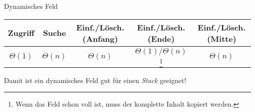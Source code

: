 \begin{defi}{Dynamisches Feld}
    \begin{center}
        \begin{tabular}{c|c|c|c|c}
            Zugriff     & Suche       & Einf./Lösch. (Anfang) & Einf./Lösch. (Ende)                                                                                     & Einf./Lösch. (Mitte) \\
            \hline
            $\Theta(1)$ & $\Theta(n)$ & $\Theta(n)$           & $\Theta(1)/\Theta(n)$\footnote{Wenn das Feld schon voll ist, muss der komplette Inhalt kopiert werden.} & $\Theta(n)$          \\
        \end{tabular}
    \end{center}

    Damit ist ein dynamisches Feld gut für einen \emph{Stack} geeignet!
\end{defi}

